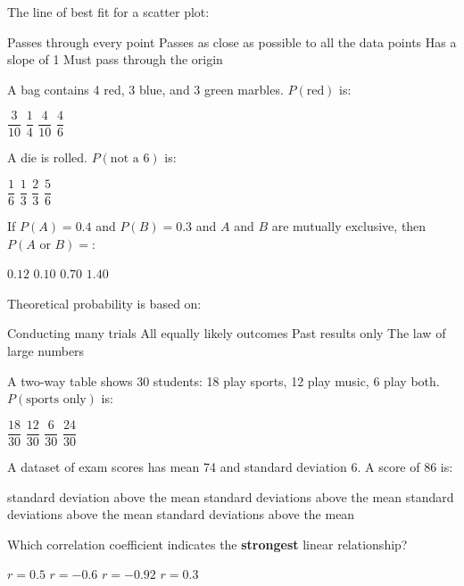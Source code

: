 \documentclass[addpoints]{exam}
\begin{document}
\begin{questions}
\question[1] The line of best fit for a scatter plot:
\begin{choices}
    \choice Passes through every point
    \correctchoice Passes as close as possible to all the data points
    \choice Has a slope of 1
    \choice Must pass through the origin
\end{choices}

\question[1] A bag contains 4 red, 3 blue, and 3 green marbles. $P(\text{red})$ is:
\begin{choices}
    \choice $\dfrac{3}{10}$
    \choice $\dfrac{1}{4}$
    \correctchoice $\dfrac{4}{10}$
    \choice $\dfrac{4}{6}$
\end{choices}

\question[1] A die is rolled. $P(\text{not a 6})$ is:
\begin{choices}
    \choice $\dfrac{1}{6}$
    \choice $\dfrac{1}{3}$
    \choice $\dfrac{2}{3}$
    \correctchoice $\dfrac{5}{6}$
\end{choices}

\question[1] If $P(A) = 0.4$ and $P(B) = 0.3$ and $A$ and $B$ are mutually exclusive, then
$P(A \text{ or } B) =$:
\begin{choices}
    \choice $0.12$
    \choice $0.10$
    \correctchoice $0.70$
    \choice $1.40$
\end{choices}

\question[1] Theoretical probability is based on:
\begin{choices}
    \choice Conducting many trials
    \correctchoice All equally likely outcomes
    \choice Past results only
    \choice The law of large numbers
\end{choices}

\question[1] A two-way table shows 30 students: 18 play sports, 12 play music, 6 play both.
$P(\text{sports only})$ is:
\begin{choices}
    \choice $\dfrac{18}{30}$
    \correctchoice $\dfrac{12}{30}$
    \choice $\dfrac{6}{30}$
    \choice $\dfrac{24}{30}$
\end{choices}

\question[1] A dataset of exam scores has mean 74 and standard deviation 6. A score of 86 is:
\begin{choices}
     standard deviation above the mean
     standard deviations above the mean
     standard deviations above the mean
     standard deviations above the mean
\end{choices}

\question[1] Which correlation coefficient indicates the \textbf{strongest} linear relationship?
\begin{choices}
    \choice $r = 0.5$
    \choice $r = -0.6$
    \correctchoice $r = -0.92$
    \choice $r = 0.3$
\end{choices}



\end{questions}
\end{document}
